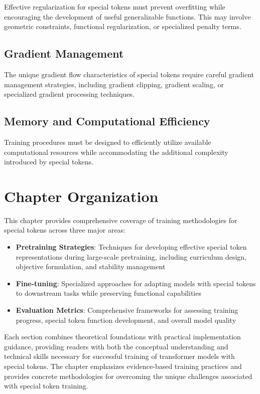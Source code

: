 Effective regularization for special tokens must prevent overfitting while encouraging the development of useful generalizable functions. This may involve geometric constraints, functional regularization, or specialized penalty terms.

\subsection{Gradient Management}

The unique gradient flow characteristics of special tokens require careful gradient management strategies, including gradient clipping, gradient scaling, or specialized gradient processing techniques.

\subsection{Memory and Computational Efficiency}

Training procedures must be designed to efficiently utilize available computational resources while accommodating the additional complexity introduced by special tokens.

\section{Chapter Organization}

This chapter provides comprehensive coverage of training methodologies for special tokens across three major areas:

\begin{itemize}
\item \textbf{Pretraining Strategies}: Techniques for developing effective special token representations during large-scale pretraining, including curriculum design, objective formulation, and stability management
\item \textbf{Fine-tuning}: Specialized approaches for adapting models with special tokens to downstream tasks while preserving functional capabilities
\item \textbf{Evaluation Metrics}: Comprehensive frameworks for assessing training progress, special token function development, and overall model quality
\end{itemize}

Each section combines theoretical foundations with practical implementation guidance, providing readers with both the conceptual understanding and technical skills necessary for successful training of transformer models with special tokens. The chapter emphasizes evidence-based training practices and provides concrete methodologies for overcoming the unique challenges associated with special token training.